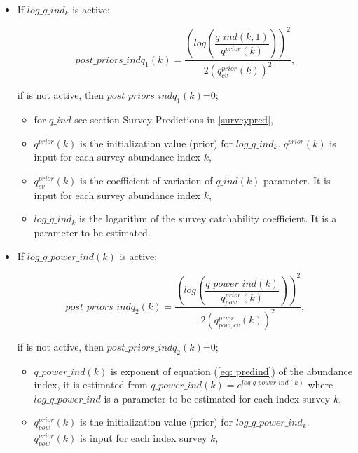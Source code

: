 \documentclass{article}
\begin{document}
\begin{itemize}
    \item If $log\_q\_ind_k$ is active:
    
    \begin{equation}
        post\_priors\_indq_1(k) = \dfrac{\left(log\left(\dfrac{q\_ind(k,1)}{q^{prior}(k)}\right)\right)^2}{2(q^{prior}_{cv}(k))^2},
    \end{equation}
    
    if is not active, then $post\_priors\_indq_1(k)$=0;
    
    \begin{itemize}
        \item for $q\_ind$ see section Survey Predictions in \ref{surveypred}, 
        
        \item $q^{prior}(k)$ is the initialization value (prior) for $log\_q\_ind_k$. $q^{prior}(k)$ is input for each survey abundance index $k$,
        
        \item $q^{prior}_{cv}(k)$ is the coefficient of variation of $q\_ind(k)$ parameter. It is input for each survey abundance index $k$,
        
        \item $log\_q\_ind_k$ is the logarithm of the survey catchability coefficient. It is a parameter to be estimated.
    \end{itemize}
    
    \item If $log\_q\_power\_ind(k)$ is active:
    
    \begin{equation}
        post\_priors\_indq_2(k) = \dfrac{\left(log\left(\dfrac{q\_power\_ind(k)}{q^{prior}_{pow}(k)}\right)\right)^2}{2(q^{prior}_{pow,cv}(k))^2},
    \end{equation}
    
    if is not active, then $post\_priors\_indq_2(k)$=0;
    
    \begin{itemize}
    \item $q\_power\_ind(k)$ is exponent of equation (\ref{eq: predind}) of the abundance index, it is estimated from $q\_power\_ind(k) = e^{log\_q\_power\_ind(k) }$ where $log\_q\_power\_ind$ is a parameter to be estimated for each index survey $k$,
    
    \item $q^{prior}_{pow}(k)$ is the initialization value (prior) for $log\_q\_power\_ind_k$. $q^{prior}_{pow}(k)$ is input for each index survey $k$,
    

\end{itemize}
\end{itemize}
\end{document}

